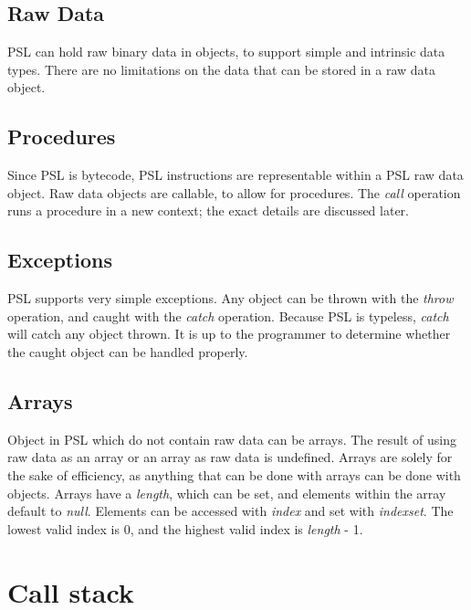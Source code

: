 \subsection{Raw Data}

PSL can hold raw binary data in objects, to support simple and intrinsic data types. There are no limitations on the data that can be stored in a raw data object.



\subsection{Procedures}

Since PSL is bytecode, PSL instructions are representable within a PSL raw data object. Raw data objects are callable, to allow for procedures. The \textit{call} operation runs a procedure in a new context; the exact details are discussed later.



\subsection{Exceptions}

PSL supports very simple exceptions. Any object can be thrown with the \textit{throw} operation, and caught with the \textit{catch} operation. Because PSL is typeless, \textit{catch} will catch any object thrown. It is up to the programmer to determine whether the caught object can be handled properly.



\subsection{Arrays}

Object in PSL which do not contain raw data can be arrays. The result of using raw data as an array or an array as raw data is undefined. Arrays are solely for the sake of efficiency, as anything that can be done with arrays can be done with objects. Arrays have a \textit{length}, which can be set, and elements within the array default to \textit{null}. Elements can be accessed with \textit{index} and set with \textit{indexset}. The lowest valid index is 0, and the highest valid index is \textit{length} - 1.



\section{Call stack}

